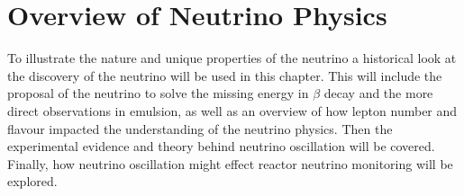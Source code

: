 

\ifpdf
    \graphicspath{{Chapter2/Figs/Raster/}{Chapter2/Figs/PDF/}{Chapter2/Figs/}}
\else
    \graphicspath{{Chapter2/Figs/Vector/}{Chapter2/Figs/}}
\fi


\chapter{Overview of Neutrino Physics}\label{Chp:ABfriefHistoryOfNeutrinos} 
To illustrate the nature and unique properties of the neutrino a historical look at the discovery of the neutrino will be used in this chapter. This will include the proposal of the neutrino to solve the missing energy in $\beta$ decay and the more direct observations in emulsion, as well as an overview of how lepton number and flavour impacted the understanding of the neutrino physics. Then the experimental evidence and theory behind neutrino oscillation will be covered. Finally, how neutrino oscillation might effect reactor neutrino monitoring will be explored. %

